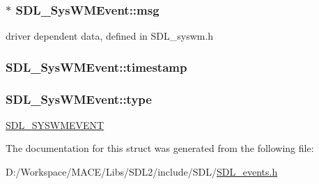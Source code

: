 \subsubsection[{\texorpdfstring{msg}{msg}}]{$\ast$ S\+D\+L\+\_\+\+Sys\+W\+M\+Event\+::msg}\hypertarget{struct_s_d_l___sys_w_m_event_ad5e3dc68aa15582cd0641847d41c74e8}{}\label{struct_s_d_l___sys_w_m_event_ad5e3dc68aa15582cd0641847d41c74e8}
driver dependent data, defined in S\+D\+L\+\_\+syswm.\+h 
\subsubsection[{\texorpdfstring{timestamp}{timestamp}}]{ S\+D\+L\+\_\+\+Sys\+W\+M\+Event\+::timestamp}\hypertarget{struct_s_d_l___sys_w_m_event_a5d3cb97006d99b620c2671c27bd82c06}{}\label{struct_s_d_l___sys_w_m_event_a5d3cb97006d99b620c2671c27bd82c06}
\subsubsection[{\texorpdfstring{type}{type}}]{ S\+D\+L\+\_\+\+Sys\+W\+M\+Event\+::type}\hypertarget{struct_s_d_l___sys_w_m_event_a84697e96cb16bf6a570e10b5bfdcd392}{}\label{struct_s_d_l___sys_w_m_event_a84697e96cb16bf6a570e10b5bfdcd392}
\hyperlink{_s_d_l__events_8h_a3b589e89be6b35c02e0dd34a55f3fccaa73749d735a18ce6ef17a09ee70d5dbe7}{S\+D\+L\+\_\+\+S\+Y\+S\+W\+M\+E\+V\+E\+NT} 

The documentation for this struct was generated from the following file\+:\begin{DoxyCompactItemize}
\item 
D\+:/\+Workspace/\+M\+A\+C\+E/\+Libs/\+S\+D\+L2/include/\+S\+D\+L/\hyperlink{_s_d_l__events_8h}{S\+D\+L\+\_\+events.\+h}\end{DoxyCompactItemize}
